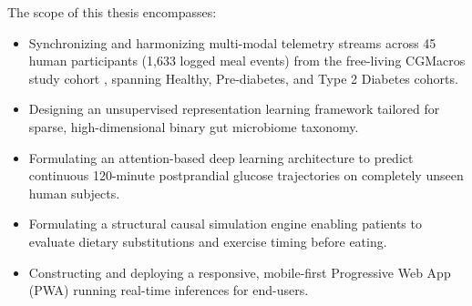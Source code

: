 The scope of this thesis encompasses:
\begin{itemize}
    \item Synchronizing and harmonizing multi-modal telemetry streams across 45 human participants (1,633 logged meal events) from the free-living CGMacros study cohort \cite{mendes2024cgmacros}, spanning Healthy, Pre-diabetes, and Type 2 Diabetes cohorts.
    \item Designing an unsupervised representation learning framework tailored for sparse, high-dimensional binary gut microbiome taxonomy.
    \item Formulating an attention-based deep learning architecture to predict continuous 120-minute postprandial glucose trajectories on completely unseen human subjects.
    \item Formulating a structural causal simulation engine enabling patients to evaluate dietary substitutions and exercise timing before eating.
    \item Constructing and deploying a responsive, mobile-first Progressive Web App (PWA) running real-time inferences for end-users.
\end{itemize}

